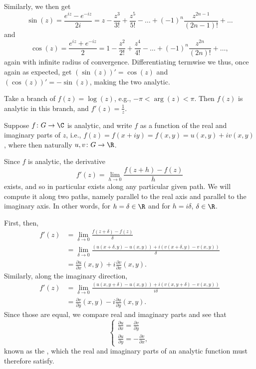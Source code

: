 \begin{example}
	Similarly, we then get
	\[
		\sin(z) = \frac{e^{i z} - e^{- i z}}{2 i} = z - \frac{z^3}{3!} + \frac{z^5}{5!} - \dots + (-1)^n \frac{z^{2 n - 1}}{(2 n - 1)!} + \dots
	\]
	and
	\[
		\cos(z) = \frac{e^{i z} + e^{- i z}}{2} = 1 - \frac{z^2}{2!} + \frac{z^4}{4!} - \dots + (-1)^n \frac{z^{2 n}}{(2 n)!} + \dots ,
	\]
	again with infinite radius of convergence.
	Differentiating termwise we thus, once again as expected, get $(\sin(z))' = \cos(z)$ and $(\cos(z))' = - \sin(z)$, making the two analytic.
\end{example}

\begin{example}
	Take a branch of $f(z) = \log(z)$, e.g., $-\pi < \arg(z) < \pi$.
	Then $f(z)$ is analytic in this branch, and $f'(z) = \frac{1}{z}$.
\end{example}


Suppose $f \colon G \to \C$ is analytic, and write $f$ as a function of the real and imaginary parts of $z$, i.e., $f(z) = f(x + i y) = f(x, y) = u(x, y) + i v(x, y)$, where then naturally $u, v \colon G \to \R$.

Since $f$ is analytic, the derivative
\[
	f'(z) = \lim_{h \to 0} \frac{f(z + h) - f(z)}{h}
\]
exists, and so in particular exists along any particular given path.
We will compute it along two paths, namely parallel to the real axis and parallel to the imaginary axis.
In other words, for $h = \delta \in \R$ and for $h = i \delta$, $\delta \in \R$.

First, then,
\begin{align*}
	f'(z) &= \lim_{\delta \to 0} \frac{f(z + \delta) - f(z)}{\delta} \\
	&= \lim_{\delta \to 0} \frac{(u(x + \delta, y) - u(x, y)) + i (v(x + \delta, y) - v(x, y))}{\delta} \\
	&= \frac{\partial u}{\partial x} (x, y) + i \frac{\partial v}{\partial x} (x, y).
\end{align*}
Similarly, along the imaginary direction,
\begin{align*}
	f'(z) &= \lim_{\delta \to 0} \frac{(u(x, y + \delta) - u(x, y)) + i (v(x, y + \delta) - v(x, y))}{i \delta} \\
	&= \frac{\partial v}{\partial y} (x, y) - i \frac{\partial u}{\partial y} (x, y).
\end{align*}
Since those are equal, we compare real and imaginary parts and see that
\[
	\begin{cases}
		\frac{\partial u}{\partial x} = \frac{\partial v}{\partial y} \\
		\frac{\partial u}{\partial y} = - \frac{\partial v}{\partial x},
	\end{cases}
\]
known as the , which the real and imaginary parts of an analytic function must therefore satisfy.

